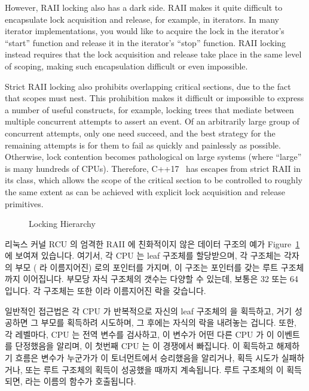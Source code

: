 However, RAII locking also has a dark side.
RAII makes it quite difficult to encapsulate lock acquisition and release,
for example, in iterators.
In many iterator implementations, you would like to acquire the lock in
the iterator's ``start'' function and release it in the iterator's ``stop''
function.
RAII locking instead requires that the lock acquisition and release take
place in the same level of scoping, making such encapsulation difficult or
even impossible.

Strict RAII locking also prohibits overlapping critical sections, due
to the fact that scopes must nest.
This prohibition makes it difficult or impossible to express a number of
useful constructs, for example, locking trees
that mediate between multiple concurrent attempts to assert an event.
Of an arbitrarily large group of concurrent attempts, only one need succeed,
and the best strategy for the remaining attempts is for them to fail as
quickly and painlessly as possible.
Otherwise, lock contention becomes pathological on large systems
(where ``large'' is many hundreds of CPUs).
Therefore, C++17~\cite{RichardSmith2019N4800} has escapes from strict RAII
in its  class, which allows the scope of the critical
section to be controlled to roughly the same extent as can be achieved
with explicit lock acquisition and release primitives.

\fi

\begin{figure}[tb]
\centering
{}
\caption{Locking Hierarchy}
\label{fig:locking:Locking Hierarchy}
\end{figure}

리눅스 커널 RCU 의 엄격한 RAII 에 친화적이지 않은 데이터 구조의 예가
Figure~\ref{fig:locking:Locking Hierarchy} 에 보여져 있습니다.
여기서, 각 CPU 는 leaf  구조체를 할당받으며, 각 
구조체는 각자의 부모 ( 라 이름지어진) 로의 포인터를 가지며, 이
구조는   포인터를 갖는 루트  구조체까지
이어집니다.
부모당 자식  구조체의 갯수는 다양할 수 있는데, 보통은 32 또는 64
입니다.
각  구조체는 또한  이라 이름지어진 락을 갖습니다.

일반적인 접근법은 각 CPU 가 반복적으로 자신의 leaf  구조체의
 을 획득하고, 거기 성공하면 그 부모를 획득하려 시도하며, 그
후에는 자식의 락을 내려놓는 겁니다.
또한, 각 레벨마다, CPU 는 전역  변수를 검사하고, 이 변수가 어떤
다른 CPU 가 이 이벤트를 단정했음을 알리며, 이 첫번째 CPU 는 이 경쟁에서
빠집니다.
이 획득하고 해제하기 흐름은  변수가 누군가가 이 토너먼트에서
승리했음을 알리거나,  획득 시도가 실패하거나, 또는 루트
 구조체의  획득이 성공했을 때까지 계속됩니다.
루트  구조체의  이 획득되면,
 라는 이름의 함수가 호출됩니다.

